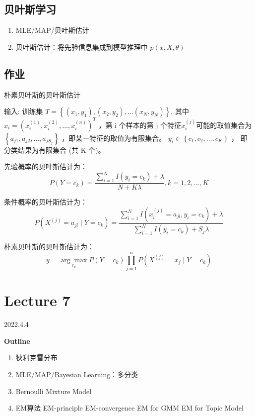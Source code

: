 \documentclass[UTF8]{ctexart}
\begin{document}
\subsection{贝叶斯学习}
\begin{enumerate}
    \item MLE/MAP/贝叶斯估计
    \item 贝叶斯估计：将先验信息集成到模型推理中 $p(x,X,\theta)$
\end{enumerate}

\subsection*{\textbf{作业} }
朴素贝叶斯的贝叶斯估计

输入: 训练集 $T=\left\{\left(x_{1}, y_{1}\right),\left(x_{2}, y_{2}\right), \ldots\left(x_{N}, y_{N}\right)\right\}$, 其中 $x_{i}=\left(x_{i}^{(1)}, x_{i}^{(2)}, \ldots, x_{i}^{(n)}\right)^{T}$ ，第 $\mathrm{i}$ 个样本的第 $\mathrm{j}$ 个特征$x_{i}^{(j)}$可能的取值集合为 $\left\{a_{j 1}, a_{j 2}, \ldots, a_{j S_{j}}\right\}$ ，即某一特征的取值为有限集合。
$y_{i} \in\left\{c_{1}, c_{2}, \ldots, c_{K}\right\}$ ， 即分类结果为有限集合 (共 $\mathrm{K}$ 个)。

先验概率的贝叶斯估计为：
$$
P\left(Y=c_{k}\right)=\frac{\sum_{i=1}^{N} I\left(y_{i}=c_{k}\right)+\lambda}{N+K\lambda}, k=1,2, \ldots, K
$$

条件概率的贝叶斯估计为：
$$
P\left(X^{(j)}=a_{j l} \mid Y=c_{k}\right)=\frac{\sum_{i=1}^{N} I\left(x_{i}^{(j)}=a_{j l}, y_{i}=c_{k}\right)+\lambda}{\sum_{i=1}^{N} I\left(y_{i}=c_{k}\right)+S_j\lambda}
$$

朴素贝叶斯的贝叶斯估计为：
$$
y=\underset{c_k}{\arg \max}P(Y=c_{k})\prod_{j=1}^nP(X^{(j)}=x_{j }\mid  Y=c_{k})
$$

\newpage
\section{Lecture 7}
2022.4.4

\textbf{Outline}
\begin{enumerate}
    \item 狄利克雷分布
    \item MLE/MAP/Bayesian Learning：多分类
    \item Bernoulli Mixture Model
    \item EM算法
        \subitem EM-principle
        \subitem EM-convergence
        \subitem EM for GMM
        \subitem EM for Topic Model
\end{enumerate}
\end{document}
